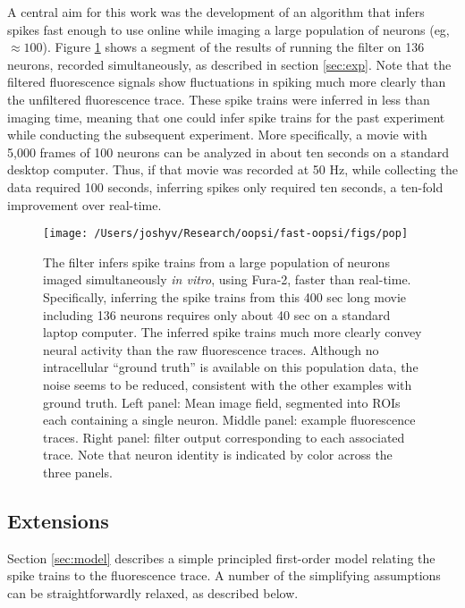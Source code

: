 A central aim for this work was the development of an algorithm that infers spikes fast enough to use online while imaging a large population of neurons (eg, $\approx 100$).  Figure \ref{fig:pop} shows a segment of the results of running the \foopsi filter on 136 neurons, recorded simultaneously, as described in section \ref{sec:exp}.  Note that the filtered fluorescence signals show fluctuations in spiking much more clearly than the unfiltered fluorescence trace. These spike trains were inferred in less than imaging time, meaning that one could infer spike trains for the past experiment while conducting the subsequent experiment. More specifically, a movie with 5,000 frames of 100 neurons can be analyzed in about ten seconds on a standard desktop computer.  Thus, if that movie was recorded at 50 Hz, while collecting the data required 100 seconds, inferring spikes only required ten seconds, a ten-fold improvement over real-time.  


\begin{figure}[h!]
\begin{centering} 
\texttt{[image: /Users/joshyv/Research/oopsi/fast-oopsi/figs/pop]}
\end{centering}
\caption[\foopsi filter is robust and works online for populations of neurons]{The \foopsi filter infers spike trains from a large population of neurons imaged simultaneously \emph{in vitro}, using Fura-2, faster than real-time.  Specifically, inferring the spike trains from this 400 sec long movie including 136 neurons requires only about 40 sec on a standard laptop computer. The inferred spike trains much more clearly convey neural activity than the raw fluorescence traces.  Although no intracellular ``ground truth'' is available on this population data, the noise seems to be reduced, consistent with the other examples with ground truth.  Left panel: Mean image field, segmented into ROIs each containing a single neuron.  Middle panel: example fluorescence traces.  Right panel: \foopsi filter output corresponding to each associated trace. Note that neuron identity is indicated by color across the three panels.} \label{fig:pop}
\end{figure}


\subsection{Extensions}

Section \ref{sec:model} describes a simple principled first-order model relating the spike trains to the fluorescence trace. A number of the simplifying assumptions can be straightforwardly relaxed, as described below.



